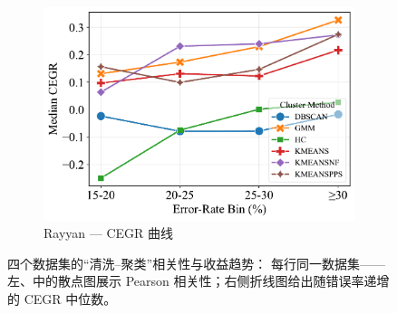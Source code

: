 \documentclass[10pt]{article} %
\numberwithin{equation}{section}
\begin{document}
\begin{figure}[htbp]
\begin{subfigure}[b]{0.33\linewidth}
    \includegraphics[width=\linewidth]{figures/6.4.3graph/CEGR_5pct_rayyan.pdf}
    \caption{Rayyan — CEGR 曲线}
    \label{fig:ra_cegr}
  \end{subfigure}

  \caption{四个数据集的“清洗–聚类”相关性与收益趋势：  
           每行同一数据集——左、中的散点图展示 Pearson 相关性；右侧折线图给出随错误率递增的 CEGR 中位数。}
  \label{fig:scatter_line_grid}
\end{figure}
\end{document}
